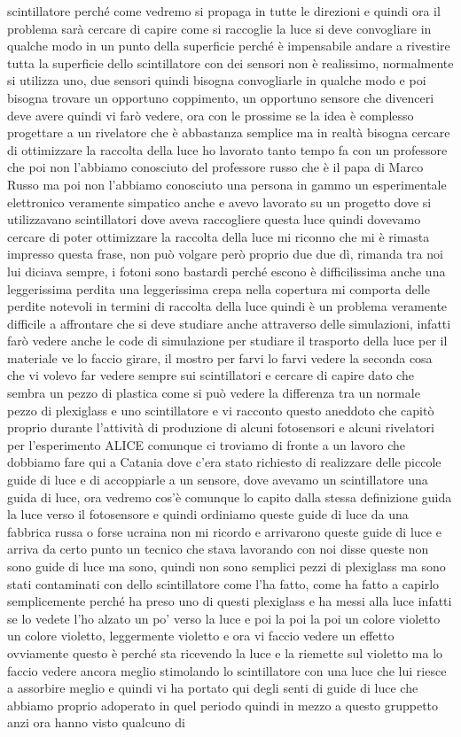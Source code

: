 {scintillatore perché come vedremo si propaga in tutte le direzioni e quindi ora il problema sarà cercare di capire come si raccoglie la luce si deve convogliare in qualche modo in un punto della superficie perché è impensabile andare a rivestire tutta la superficie dello scintillatore con dei sensori non è realissimo, normalmente si utilizza uno, due sensori quindi bisogna convogliarle in qualche modo e poi bisogna trovare un opportuno coppimento, un opportuno sensore che divenceri deve avere quindi vi farò vedere, ora con le prossime se la idea è complesso progettare a un rivelatore che è abbastanza semplice ma in realtà bisogna cercare di ottimizzare la raccolta della luce ho lavorato tanto tempo fa con un professore che poi non l'abbiamo conosciuto del professore russo che è il papa di Marco Russo ma poi non l'abbiamo conosciuto una persona in gammo un esperimentale elettronico veramente simpatico anche e avevo lavorato su un progetto dove si utilizzavano scintillatori dove aveva raccogliere questa luce quindi dovevamo cercare di poter ottimizzare la raccolta della luce mi riconno che mi è rimasta impresso questa frase, non può volgare però proprio due due dì, rimanda tra noi lui diciava sempre, i fotoni sono bastardi perché escono è difficilissima anche una leggerissima perdita una leggerissima crepa nella copertura mi comporta delle perdite notevoli in termini di raccolta della luce quindi è un problema veramente difficile a affrontare che si deve studiare anche attraverso delle simulazioni, infatti farò vedere anche le code di simulazione per studiare il trasporto della luce per il materiale ve lo faccio girare, il mostro per farvi lo farvi vedere la seconda cosa che vi volevo far vedere sempre sui scintillatori e cercare di capire dato che sembra un pezzo di plastica come si può vedere la differenza tra un normale pezzo di plexiglass e uno scintillatore e vi racconto questo aneddoto che capitò proprio durante l'attività di produzione di alcuni fotosensori e alcuni rivelatori per l'esperimento ALICE comunque ci troviamo di fronte a un lavoro che dobbiamo fare qui a Catania dove c'era stato richiesto di realizzare delle piccole guide di luce e di accoppiarle a un sensore, dove avevamo un scintillatore una guida di luce, ora vedremo cos'è comunque lo capito dalla stessa definizione guida la luce verso il fotosensore e quindi ordiniamo queste guide di luce da una fabbrica russa o forse ucraina non mi ricordo e arrivarono queste guide di luce e arriva da certo punto un tecnico che stava lavorando con noi disse queste non sono guide di luce ma sono, quindi non sono semplici pezzi di plexiglass ma sono stati contaminati con dello scintillatore come l'ha fatto, come ha fatto a capirlo semplicemente perché ha preso uno di questi plexiglass e ha messi alla luce infatti se lo vedete l'ho alzato un po' verso la luce e poi la poi la poi un colore violetto un colore violetto, leggermente violetto e ora vi faccio vedere un effetto ovviamente questo è perché sta ricevendo la luce e la riemette sul violetto ma lo faccio vedere ancora meglio stimolando lo scintillatore con una luce che lui riesce a assorbire meglio e quindi vi ha portato qui degli senti di guide di luce che abbiamo proprio adoperato in quel periodo quindi in mezzo a questo gruppetto anzi ora hanno visto qualcuno di }
